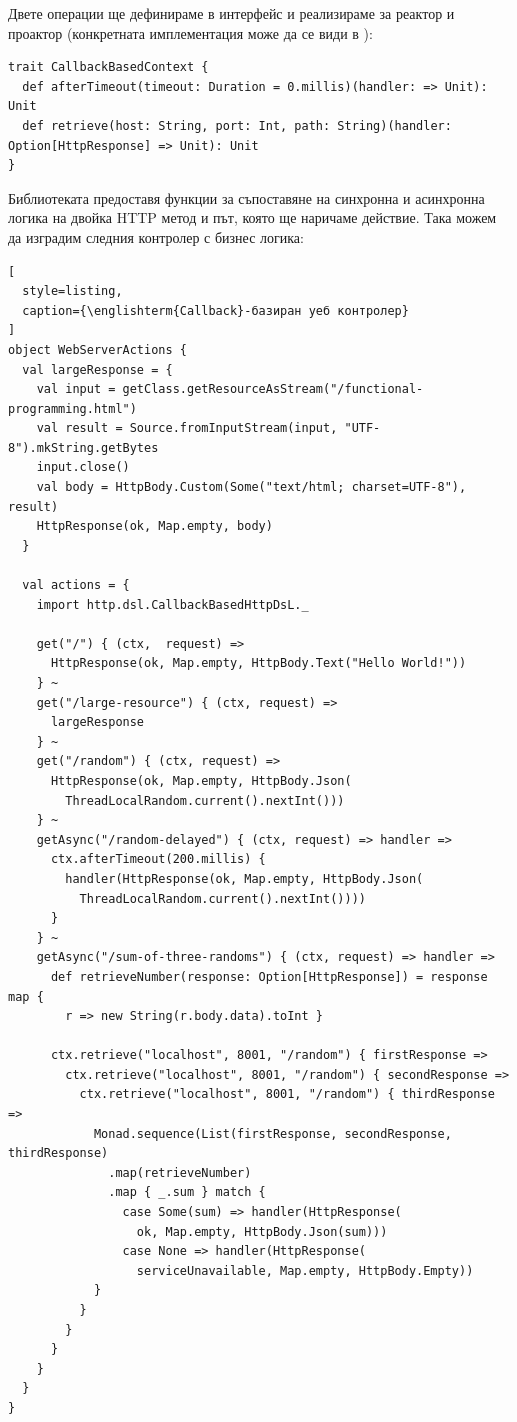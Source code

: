 Двете операции ще дефинираме в интерфейс  и реализираме за реактор и проактор (конкретната имплементация може да се види в ):

\begin{lstlisting}
trait CallbackBasedContext {
  def afterTimeout(timeout: Duration = 0.millis)(handler: => Unit): Unit
  def retrieve(host: String, port: Int, path: String)(handler: Option[HttpResponse] => Unit): Unit
}
\end{lstlisting}

Библиотеката предоставя функции за съпоставяне на синхронна и асинхронна логика на двойка HTTP метод и път, която ще наричаме действие. Така можем да изградим следния контролер с бизнес логика:

\begin{lstlisting}[
  style=listing,
  caption={\englishterm{Callback}-базиран уеб контролер}
]
object WebServerActions {
  val largeResponse = {
    val input = getClass.getResourceAsStream("/functional-programming.html")
    val result = Source.fromInputStream(input, "UTF-8").mkString.getBytes
    input.close()
    val body = HttpBody.Custom(Some("text/html; charset=UTF-8"), result)
    HttpResponse(ok, Map.empty, body)
  }
  
  val actions = {
    import http.dsl.CallbackBasedHttpDsL._
    
    get("/") { (ctx,  request) =>
      HttpResponse(ok, Map.empty, HttpBody.Text("Hello World!"))
    } ~
    get("/large-resource") { (ctx, request) =>
      largeResponse
    } ~
    get("/random") { (ctx, request) =>
      HttpResponse(ok, Map.empty, HttpBody.Json(
        ThreadLocalRandom.current().nextInt()))
    } ~
    getAsync("/random-delayed") { (ctx, request) => handler =>
      ctx.afterTimeout(200.millis) {
        handler(HttpResponse(ok, Map.empty, HttpBody.Json(
          ThreadLocalRandom.current().nextInt())))
      }
    } ~
    getAsync("/sum-of-three-randoms") { (ctx, request) => handler =>
      def retrieveNumber(response: Option[HttpResponse]) = response map {
        r => new String(r.body.data).toInt }
      
      ctx.retrieve("localhost", 8001, "/random") { firstResponse =>
        ctx.retrieve("localhost", 8001, "/random") { secondResponse =>
          ctx.retrieve("localhost", 8001, "/random") { thirdResponse =>
            Monad.sequence(List(firstResponse, secondResponse, thirdResponse)
              .map(retrieveNumber)
              .map { _.sum } match {
                case Some(sum) => handler(HttpResponse(
                  ok, Map.empty, HttpBody.Json(sum)))
                case None => handler(HttpResponse(
                  serviceUnavailable, Map.empty, HttpBody.Empty))
            }
          }
        }
      }
    }
  }
}
\end{lstlisting}

